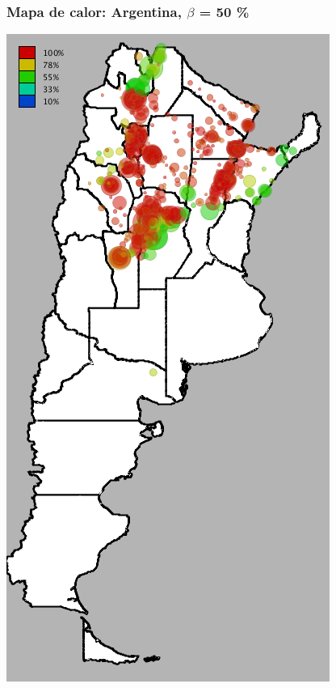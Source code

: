 \documentclass{beamer}
\begin{document}
\begin{frame}
	\frametitle{Mapa de calor: Argentina, $\beta$ = 50 \%}
	\center
	\includegraphics[height=.9\textheight,width = .9\columnwidth, keepaspectratio]
	{slides/201112_hi_res_argentina_usuarios_proporcion_circulos_beta50.png}
\end{frame}

\end{document}
